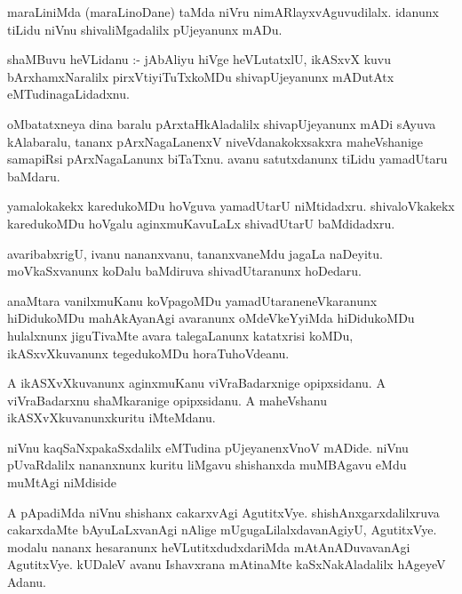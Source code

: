 \documentclass{article}
\begin{document}
\begin{mn}
maraLiniMda (maraLinoDane) taMda  niVru  nimARlayxvAguvudilalx.  idanunx  tiLidu  niVnu  shivaliMgadalilx  pUjeyanunx  mADu.
\end{mn}

\begin{mn}
shaMBuvu  heVLidanu :- jAbAliyu  hiVge  heVLutatxlU,  ikASxvX kuvu  bArxhamxNaralilx    pirxVtiyiTuTxkoMDu  
shivapUjeyanunx  mADutAtx  eMTudinagaLidadxnu. 
\end{mn}

\begin{mn}
oMbatatxneya  dina  baralu  pArxtaHkAladalilx  shivapUjeyanunx  mADi  sAyuva  kAlabaralu,  tananx  pArxNagaLanenxV  
niveVdanakokxsakxra  maheVshanige  samapiRsi  pArxNagaLanunx  biTaTxnu.  avanu  satutxdanunx  tiLidu  yamadUtaru  baMdaru.  
\end{mn}

\begin{mn}
yamalokakekx  karedukoMDu  hoVguva  yamadUtarU  niMtidadxru.  shivaloVkakekx  karedukoMDu  hoVgalu  
aginxmuKavuLaLx  shivadUtarU  baMdidadxru.
\end{mn}

\begin{mn}
avaribabxrigU,  ivanu  nananxvanu,  tananxvaneMdu  jagaLa  naDeyitu.  moVkaSxvanunx  koDalu  baMdiruva  shivadUtaranunx  hoDedaru.
\end{mn}

\begin{mn}
anaMtara  vanilxmuKanu  koVpagoMDu  yamadUtaraneneVkaranunx  hiDidukoMDu  mahAkAyanAgi  avaranunx  oMdeVkeYyiMda  hiDidukoMDu  
hulalxnunx  jiguTivaMte  avara  talegaLanunx  katatxrisi  koMDu,  ikASxvXkuvanunx  tegedukoMDu  horaTuhoVdeanu.
\end{mn}

\begin{mn}
A  ikASXvXkuvanunx  aginxmuKanu  viVraBadarxnige  opipxsidanu.  A  viVraBadarxnu  shaMkaranige  
opipxsidanu.  A  maheVshanu  ikASXvXkuvanunxkuritu  iMteMdanu. 
\end{mn}

\begin{mn}
niVnu  kaqSaNxpakaSxdalilx  eMTudina  pUjeyanenxVnoV  mADide.  niVnu  pUvaRdalilx  nananxnunx  
kuritu  liMgavu  shishanxda  muMBAgavu  eMdu  muMtAgi  niMdiside
\end{mn}

\begin{mn}
A  pApadiMda  niVnu  shishanx  cakarxvAgi  AgutitxVye.  shishAnxgarxdalilxruva  cakarxdaMte  bAyuLaLxvanAgi  
nAlige  mUgugaLilalxdavanAgiyU,  AgutitxVye.  modalu  nananx  hesaranunx  heVLutitxdudxdariMda  mAtAnADuvavanAgi  
AgutitxVye.  kUDaleV  avanu  Ishavxrana  mAtinaMte  kaSxNakAladalilx  hAgeyeV  Adanu.
\end{mn}
\end{document}
